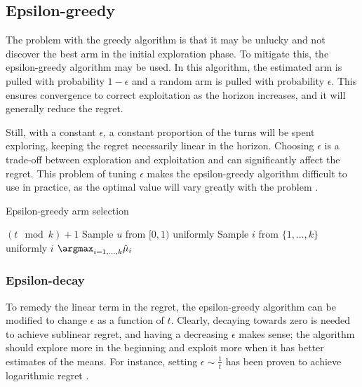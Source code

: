 \subsection{Epsilon-greedy}
The problem with the greedy algorithm is that it may be unlucky and not discover the best arm in the initial exploration phase.
To mitigate this, the epsilon-greedy algorithm may be used.
In this algorithm, the estimated arm is pulled with probability $1-\epsilon$ and a random arm is pulled with probability $\epsilon$.
This ensures convergence to correct exploitation as the horizon increases, and it will generally reduce the regret.

Still, with a constant $\epsilon$, a constant proportion of the turns will be spent exploring, keeping the regret necessarily linear in the horizon.
Choosing $\epsilon$ is a trade-off between exploration and exploitation and can significantly affect the regret.
This problem of tuning $\epsilon$ makes the epsilon-greedy algorithm difficult to use in practice, as the optimal value will vary greatly with the problem \cite{citation needed}.

\begin{algorithm}
    \caption{Epsilon-greedy arm selection}
    \label{alg:eps_greedy}
    \begin{algorithmic}
        \State \Return $(t \mod k) + 1$
        \Else
        \State Sample $u$ from $[0,1)$ uniformly
        \State Sample $i$ from $\{1,\dots, k\}$ uniformly
        \State \Return $i$
        \Else
        \State \Return $\argmax_{i=1,\dots,k} \hat{\mu}_i$
        \EndIf
        \EndIf
    \end{algorithmic}
\end{algorithm}


\subsubsection{Epsilon-decay}
To remedy the linear term in the regret, the epsilon-greedy algorithm can be modified to change $\epsilon$ as a function of $t$.
Clearly, decaying towards zero is needed to achieve sublinear regret, and having a decreasing $\epsilon$ makes sense; the algorithm should explore more in the beginning and exploit more when it has better estimates of the means.
For instance, setting $\epsilon \sim \frac{1}{t}$ has been proven to achieve logarithmic regret \cite{auer2002}.

